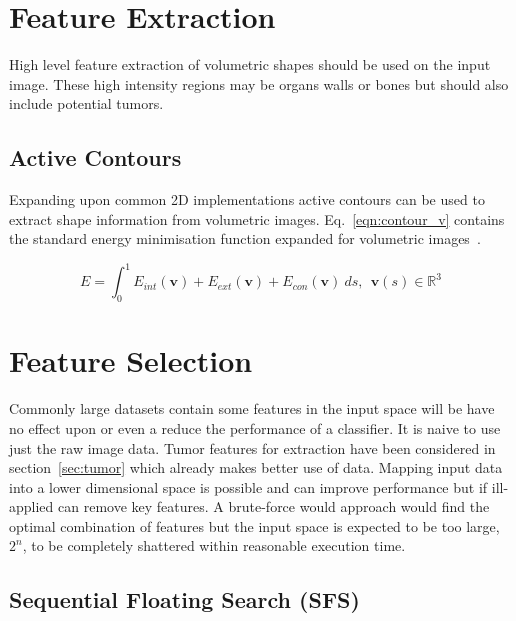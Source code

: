 \documentclass[journal]{IEEEtran}
\begin{document}
\section{Feature Extraction}
\label{sec:extraction}

High level feature extraction of volumetric shapes should be used on the input image.
These high intensity regions may be organs walls or bones but should also include potential tumors.




\subsection{Active Contours}

Expanding upon common 2D implementations active contours can be used to extract shape information from volumetric images.
Eq.~\eqref{eqn:contour_v} contains the standard energy minimisation function expanded for volumetric images~\cite{nixon02feature,skalski13automatic}. 

\begin{equation}
	E = \int_0^{1} E_{int}(\mathbf{v}) + E_{ext}(\mathbf{v}) + E_{con}(\mathbf{v})\:ds,\:\:\mathbf{v}(s) \in \mathbb{R}^3
	\label{eqn:contour_v}
\end{equation}













\section{Feature Selection}
\label{sec:selection}

Commonly large datasets contain some features in the input space will be have no effect upon or even a reduce the performance of a classifier.
It is naive to use just the raw image data.
Tumor features for extraction have been considered in section~\ref{sec:tumor} which already makes better use of data. 
Mapping input data into a lower dimensional space is possible and can improve performance but if ill-applied can remove key features.
A brute-force would approach would find the optimal combination of features but the input space is expected to be too large, $2^n$, to be completely shattered within reasonable execution time. 



\subsection{Sequential Floating Search (SFS)}
\end{document}
